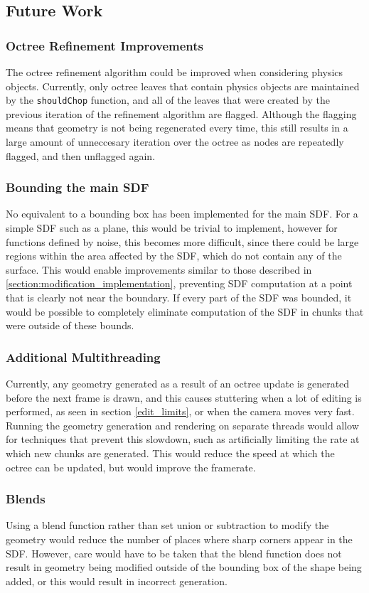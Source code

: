 \documentclass[11pt]{article}
\begin{document}
\subsection{Future Work}
\label{section:future_work}
\subsubsection{Octree Refinement Improvements}
The octree refinement algorithm could be improved when considering physics objects. Currently, only octree leaves that contain physics objects are maintained by the \texttt{shouldChop} function, and all of the leaves that were created by the previous iteration of the refinement algorithm are flagged. Although the flagging means that geometry is not being regenerated every time, this still results in a large amount of unneccesary iteration over the octree as nodes are repeatedly flagged, and then unflagged again.
\subsubsection{Bounding the main SDF}
No equivalent to a bounding box has been implemented for the main SDF. For a simple SDF such as a plane, this would be trivial to implement, however for functions defined by noise, this becomes more difficult, since there could be large regions within the area affected by the SDF, which do not contain any of the surface. This would enable improvements similar to those described in \ref{section:modification_implementation}, preventing SDF computation at a point that is clearly not near the boundary. If every part of the SDF was bounded, it would be possible to completely eliminate computation of the SDF in chunks that were outside of these bounds. 
\subsubsection{Additional Multithreading}
Currently, any geometry generated as a result of an octree update is generated before the next frame is drawn, and this causes stuttering when a lot of editing is performed, as seen in section \ref{edit_limits}, or when the camera moves very fast. Running the geometry generation and rendering on separate threads would allow for techniques that prevent this slowdown, such as artificially limiting the rate at which new chunks are generated. This would reduce the speed at which the octree can be updated, but would improve the framerate.
\subsubsection{Blends}
Using a blend function rather than set union or subtraction to modify the geometry would reduce the number of places where sharp corners appear in the SDF. However, care would have to be taken that the blend function does not result in geometry being modified outside of the bounding box of the shape being added, or this would result in incorrect generation.
\end{document}

